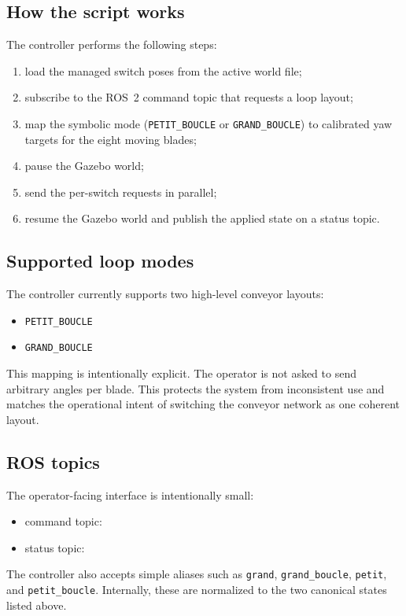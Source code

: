 \documentclass[11pt,a4paper]{article}
\begin{document}
\subsection{How the script works}
The controller performs the following steps:
\begin{enumerate}
\item load the managed switch poses from the active world file;
\item subscribe to the ROS~2 command topic that requests a loop layout;
\item map the symbolic mode (\texttt{PETIT\_BOUCLE} or \texttt{GRAND\_BOUCLE}) to calibrated yaw targets for the eight moving blades;
\item pause the Gazebo world;
\item send the per-switch  requests in parallel;
\item resume the Gazebo world and publish the applied state on a status topic.
\end{enumerate}

\subsection{Supported loop modes}
The controller currently supports two high-level conveyor layouts:
\begin{itemize}
\item \texttt{PETIT\_BOUCLE}
\item \texttt{GRAND\_BOUCLE}
\end{itemize}

This mapping is intentionally explicit. The operator is not asked to send arbitrary angles per blade. This protects the system from inconsistent use and matches the operational intent of switching the conveyor network as one coherent layout.

\subsection{ROS topics}
The operator-facing interface is intentionally small:
\begin{itemize}
\item command topic: 
\item status topic: 
\end{itemize}

The controller also accepts simple aliases such as \texttt{grand}, \texttt{grand\_boucle}, \texttt{petit}, and \texttt{petit\_boucle}. Internally, these are normalized to the two canonical states listed above.
\end{document}
